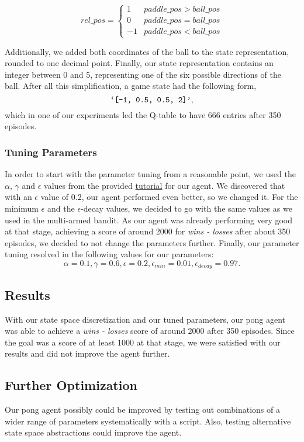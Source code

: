 \documentclass[10pt]{article}
\begin{document}
    \[\mathit{rel\_pos} = \begin{cases}
                              1 & \mathit{paddle\_pos} > \mathit{ball\_pos} \\
                              0 & \mathit{paddle\_pos} = \mathit{ball\_pos} \\
                              -1 & \mathit{paddle\_pos} < \mathit{ball\_pos}
    \end{cases}
    \]

    Additionally, we added both coordinates of the ball to the state representation, rounded to one decimal point.
    Finally, our state representation contains an integer between 0 and 5, representing one of the six possible directions of the ball.
    After all this simplification, a game state had the following form,\[\texttt{\lq[-1, 0.5, 0.5, 2]\rq},\] which in one of our experiments led the Q-table to have 666 entries after 350 episodes.

    \subsubsection{Tuning Parameters}
    In order to start with the parameter tuning from a reasonable point, we used the $\alpha$, $\gamma$ and $\epsilon$ values from the provided \href{https://www.learndatasci.com/tutorials/reinforcement-q-learning-scratch-python-openai-gym/}{tutorial} for our agent.
    We discovered that with an $\epsilon$ value of 0.2, our agent performed even better, so we changed it.
    For the minimum $\epsilon$ and the $\epsilon$-decay values, we decided to go with the same values as we used in the multi-armed bandit.
    As our agent was already performing very good at that stage, achieving a score of around 2000 for \textit{wins - losses} after about 350 episodes, we decided to not change the parameters further.
    Finally, our parameter tuning resolved in the following values for our parameters:
    \[\alpha = 0.1, \gamma = 0.6, \epsilon = 0.2, \epsilon_\mathit{min} = 0.01, \epsilon_\mathit{decay} = 0.97.\]

    \subsection{Results}\label{subsec:pong-results}
    With our state space discretization and our tuned parameters, our pong agent was able to achieve a \textit{wins - losses} score of around 2000 after 350 episodes.
    Since the goal was a score of at least 1000 at that stage, we were satisfied with our results and did not improve the agent further.

    \subsection{Further Optimization}\label{subsec:pong-further-optimization}
    Our pong agent possibly could be improved by testing out combinations of a wider range of parameters systematically with a script.
    Also, testing alternative state space abstractions could improve the agent.
\end{document}

